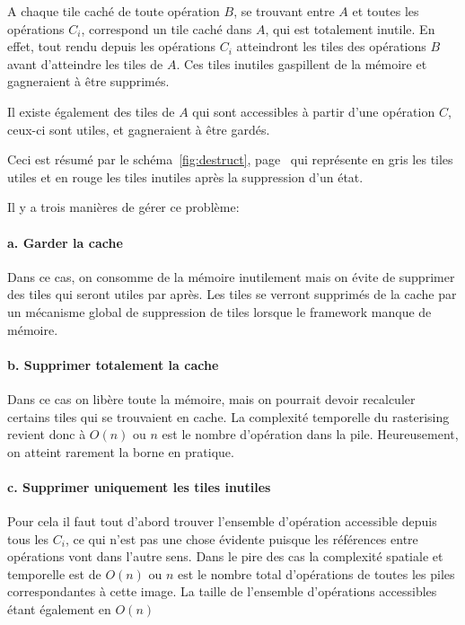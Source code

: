 			A chaque tile caché de toute opération $B$, se trouvant entre $A$ et toutes les opérations $C_i$, correspond un tile caché dans $A$,
			qui est totalement inutile. En effet, tout rendu depuis les opérations $C_i$ atteindront les tiles des opérations $B$ avant d'atteindre
			les tiles de $A$. Ces tiles inutiles gaspillent de la mémoire et gagneraient à être supprimés.

			Il existe également des tiles de $A$ qui sont accessibles à partir d'une opération $C$, ceux-ci sont utiles, et gagneraient à être
			gardés. 

			Ceci est résumé par le schéma~\ref{fig:destruct}, page~\pageref{fig:destruct} qui représente en gris les tiles utiles et
			en rouge les tiles inutiles après la suppression d'un état.

			Il y a trois manières de gérer ce problème:
			\paragraph{a. Garder la cache}
				Dans ce cas, on consomme de la mémoire inutilement mais on évite de supprimer des tiles qui seront utiles par après.
				Les tiles se verront supprimés de la cache par un mécanisme global de suppression de tiles lorsque le framework manque
				de mémoire.

			\paragraph{b. Supprimer totalement la cache}
				Dans ce cas on libère toute la mémoire, mais on pourrait devoir recalculer certains tiles qui se trouvaient en cache.
				La complexité temporelle du rasterising revient donc à $O(n)$ ou $n$ est le nombre d'opération dans la pile. Heureusement,
				on atteint rarement la borne en pratique. 

			\paragraph{c. Supprimer uniquement les tiles inutiles}
				Pour cela il faut tout d'abord trouver l'ensemble d'opération accessible depuis tous les $C_i$, ce qui n'est pas une chose 
				évidente puisque les références entre opérations vont dans l'autre sens. Dans le pire des cas la complexité spatiale
				et temporelle est de $O(n)$ ou $n$ est le nombre total d'opérations de toutes les piles correspondantes à cette image.
				La taille de l'ensemble d'opérations accessibles étant également en $O(n)$
				
